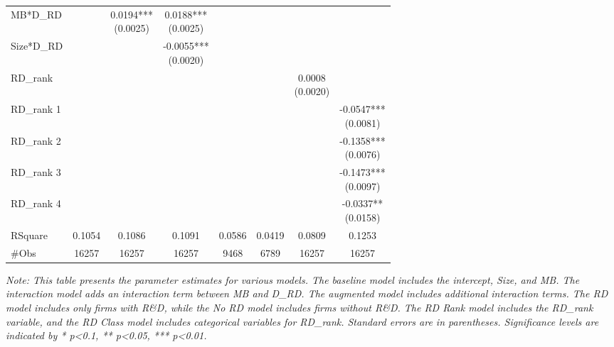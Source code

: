 \documentclass[12pt, times]{article}
\begin{document}
\begin{table}[h!]
\begin{tabular}{lccccccc}
        MB*D\_RD & & \makecell{0.0194*** \\ (0.0025)} & \makecell{0.0188*** \\ (0.0025)} & & & \\
        Size*D\_RD & & & \makecell{-0.0055*** \\ (0.0020)} & & & \\
        RD\_rank & & & & & &\makecell{0.0008 \\ (0.0020)} &  \\
        RD\_rank 1 & & & & & & & \makecell{-0.0547*** \\ (0.0081)} \\
        RD\_rank 2 & & & & & & & \makecell{-0.1358*** \\ (0.0076)} \\
        RD\_rank 3 & & & & & & & \makecell{-0.1473*** \\ (0.0097)} \\
        RD\_rank 4 & & & & & & & \makecell{-0.0337** \\ (0.0158)} \\
        \midrule
        RSquare & 0.1054 & 0.1086 & 0.1091 & 0.0586 & 0.0419 & 0.0809 & 0.1253 \\
        \#Obs & 16257 & 16257 & 16257 & 9468 & 6789 & 16257 & 16257 \\
        \bottomrule
    \end{tabular}
    \newline
    \textit{Note: This table presents the parameter estimates for various models. 
    The baseline model includes the intercept, Size, and MB. 
    The interaction model adds an interaction term between MB and D\_RD. 
    The augmented model includes additional interaction terms. 
    The RD model includes only firms with R\&D, while the No RD model includes firms without R\&D. 
    The RD Rank model includes the RD\_rank variable, 
    and the RD Class model includes categorical variables for RD\_rank. 
    Standard errors are in parentheses. 
    Significance levels are indicated by * p<0.1, ** p<0.05, *** p<0.01.}
\end{table}
\end{document}

